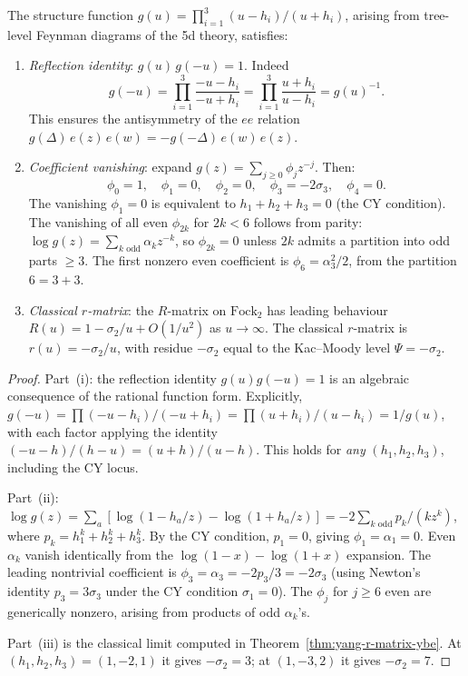 \begin{proposition}
\label{prop:tree-level-g}
The structure function $g(u) = \prod_{i=1}^{3}(u-h_i)/(u+h_i)$, arising from tree-level Feynman diagrams of the 5d theory, satisfies:
\begin{enumerate}[label=\textup{(\roman*)}]
 \item \emph{Reflection identity}: $g(u)\,g(-u)=1$. Indeed
 \[
 g(-u)=\prod_{i=1}^{3}\frac{-u-h_i}{-u+h_i}
      =\prod_{i=1}^{3}\frac{u+h_i}{u-h_i}=g(u)^{-1}.
 \]
 This ensures the antisymmetry of the $ee$ relation $g(\Delta)\, e(z)\, e(w) = -g(-\Delta)\, e(w)\, e(z)$.
 \item \emph{Coefficient vanishing}: expand $g(z) = \sum_{j \geq 0} \phi_j z^{-j}$. Then:
 \[
 \phi_0 = 1,\quad \phi_1 = 0,\quad \phi_2 = 0,\quad \phi_3 = -2\sigma_3,\quad \phi_4 = 0.
 \]
 The vanishing $\phi_1 = 0$ is equivalent to $h_1 + h_2 + h_3 = 0$ (the CY condition). The vanishing of all even $\phi_{2k}$ for $2k < 6$ follows from parity: $\log g(z) = \sum_{k \text{ odd}} \alpha_k z^{-k}$, so $\phi_{2k} = 0$ unless $2k$ admits a partition into odd parts $\geq 3$. The first nonzero even coefficient is $\phi_6 = \alpha_3^2/2$, from the partition $6 = 3 + 3$.
 \item \emph{Classical $r$-matrix}: the $R$-matrix on $\mathrm{Fock}_2$ has leading behaviour $R(u) = 1 - \sigma_2/u + O(1/u^2)$ as $u \to \infty$. The classical $r$-matrix is $r(u) = -\sigma_2/u$, with residue $-\sigma_2$ equal to the Kac--Moody level $\Psi = -\sigma_2$.
\end{enumerate}
\end{proposition}

\begin{proof}
Part~(i): the reflection identity $g(u) g(-u) = 1$ is an algebraic consequence of the rational function form. Explicitly, $g(-u) = \prod (-u-h_i)/(-u+h_i) = \prod (u+h_i)/(u-h_i) = 1/g(u)$, with each factor applying the identity $(-u-h)/(h-u) = (u+h)/(u-h)$. This holds for \emph{any} $(h_1,h_2,h_3)$, including the CY locus.

Part~(ii): $\log g(z) = \sum_a [\log(1-h_a/z) - \log(1+h_a/z)] = -2\sum_{k \text{ odd}} p_k/(k z^k)$, where $p_k = h_1^k + h_2^k + h_3^k$. By the CY condition, $p_1 = 0$, giving $\phi_1 = \alpha_1 = 0$. Even $\alpha_k$ vanish identically from the $\log(1-x) - \log(1+x)$ expansion. The leading nontrivial coefficient is $\phi_3 = \alpha_3 = -2p_3/3 = -2\sigma_3$ (using Newton's identity $p_3 = 3\sigma_3$ under the CY condition $\sigma_1 = 0$). The $\phi_j$ for $j \geq 6$ even are generically nonzero, arising from products of odd $\alpha_k$'s.

Part~(iii) is the classical limit computed in
Theorem~\ref{thm:yang-r-matrix-ybe}.  At $(h_1,h_2,h_3)=(1,-2,1)$ it
gives $-\sigma_2=3$; at $(1,-3,2)$ it gives $-\sigma_2=7$.
\end{proof}

